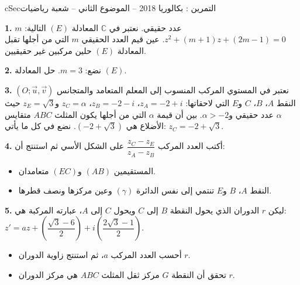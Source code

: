 \documentclass[12pt,a4paper]{article}
\newenvironment{BOX}[2]{\begin{otherlanguage}{english}\begin{arbox}{#1}{#2}}{\end{arbox}\end{otherlanguage}}
\newcounter{exo}
\newenvironment{tamrin}[1]{\stepcounter{exo}\begin{BOX}{cSec}{التمرين \theexo: #1}}{\end{BOX}}
\newenvironment{sq}{\begin{itemize}[leftmargin=2.4em,itemsep=3pt]}{\end{itemize}}
\newcommand{\qa}{\item[(أ)]}\newcommand{\qb}{\item[(ب)]}\newcommand{\qc}{\item[(جـ)]}\newcommand{\qd}{\item[(د)]}\newcommand{\qe}{\item[(هـ)]}
\newcommand{\QQ}[1]{\par\smallskip\textbf{#1.} }
\begin{document}
\begin{tamrin}{بكالوريا 2018 -- الموضوع الثاني -- شعبة رياضيات}
\QQ{1} $m$ عدد حقيقي. نعتبر في $\mathbb{C}$ المعادلة $(E)$ التالية: $z^2+(m+1)z+(2m-1)=0$.
عين قيم العدد الحقيقي $m$ التي من أجلها تقبل المعادلة $(E)$ حلين مركبين غير حقيقيين.

\QQ{2} نضع: $m=3$. حل المعادلة $(E)$.

\QQ{3} نعتبر في المستوي المركب المنسوب إلى المعلم المتعامد والمتجانس $\left(O;\vec u,\vec v\right)$ النقط $A$، $B$، $C$ و$E$ التي لاحقاتها:
$z_A=-2+i$، $z_B=-2-i$، $z_C=\alpha$ و$z_E=\sqrt3$ حيث $\alpha$ عدد حقيقي و$\alpha>-2$.
بين أن قيمة $\alpha$ التي من أجلها يكون المثلث $ABC$ متقايس الأضلاع هي $\left(-2+\sqrt3\right)$.
نضع في كل ما يأتي: $z_C=-2+\sqrt3$.

\QQ{4} أكتب العدد المركب $\dfrac{z_C-z_E}{z_A-z_B}$ على الشكل الأسي ثم استنتج أن:
\begin{sq}
\qa المستقيمين $(AB)$ و$(EC)$ متعامدان.
\qb النقط $A$، $B$ و$E$ تنتمي إلى نفس الدائرة $(\gamma)$ وعين مركزها ونصف قطرها.
\end{sq}
\QQ{5} ليكن $r$ الدوران الذي يحول النقطة $B$ إلى $C$ ويحول $C$ إلى $A$، عبارته المركبة هي:
$z'=az+\left(\dfrac{\sqrt3-6}{2}\right)+i\left(\dfrac{2\sqrt3-1}{2}\right)$.
\begin{sq}
\qa أحسب العدد المركب $a$، ثم استنتج زاوية الدوران $r$.
\qb تحقق أن النقطة $G$ مركز ثقل المثلث $ABC$ هي مركز الدوران $r$.
\end{sq}
\end{tamrin}
\end{document}

